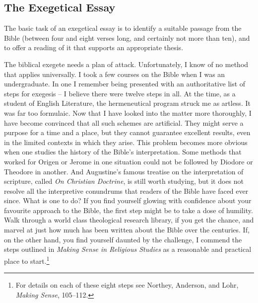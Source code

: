 \documentclass[11pt,twocolumn]{article}
\begin{document}
\subsection{The Exegetical Essay}

The basic task of an exegetical essay is to identify a suitable passage
from the Bible (between four and eight verses long, and certainly not
more than ten), and to offer a reading of it that supports an
appropriate thesis.

The biblical exegete needs a plan of attack. Unfortunately, I know of no
method that applies universally. I took a few courses on the Bible when
I was an undergraduate. In one I remember being presented with an
authoritative list of steps for exegesis – I believe there were twelve
steps in all. At the time, as a student of English Literature, the
hermeneutical program struck me as artless. It was far too formulaic.
Now that I have looked into the matter more thoroughly, I have become
convinced that all such schemes are artificial. They might serve a
purpose for a time and a place, but they cannot guarantee excellent
results, even in the limited contexts in which they arise. This problem
becomes more obvious when one studies the history of the Bible's
interpretation. Some methods that worked for Origen or Jerome in one
situation could not be followed by Diodore or Theodore in another. And
Augustine's famous treatise on the interpretation of scripture, called
\emph{On Christian Doctrine}, is still worth studying, but it does not
resolve all the interpretive conundrums that readers of the Bible have
faced ever since. What is one to do? If you find yourself glowing with
confidence about your favourite approach to the Bible, the first step
might be to take a dose of humility. Walk through a world class
theological research library, if you get the chance, and marvel at just
how much has been written about the Bible over the centuries. If, on the
other hand, you find yourself daunted by the challenge, I commend the
steps outlined in \emph{Making Sense in Religious Studies} as a
reasonable and practical place to start.\footnote{For details on each of
these eight steps see Northey, Anderson, and Lohr, \emph{Making Sense},
105–112.}
\end{document}
